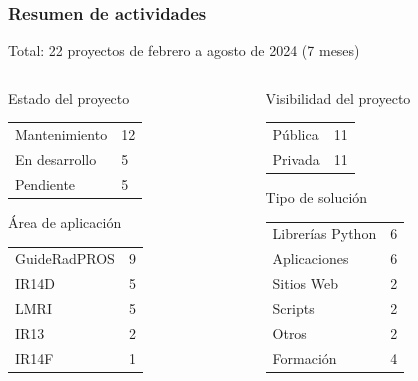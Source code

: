 \documentclass{beamer}
\newcommand{\highlight}[1]{{\color{blue} #1}}
\begin{document}
	\begin{frame}
		\frametitle{Resumen de actividades}
		\centering
		\highlight{Total}: 22 proyectos de febrero a agosto de 2024 (7 meses)
		\begin{columns}
			\begin{column}{0.35\textwidth}
				\begin{block}{Estado del proyecto}
					\begin{tabular}{ll}
						Mantenimiento&12\\
						En desarrollo&5\\
						Pendiente&5\\
					\end{tabular}
				\end{block}
				\begin{block}{Área de aplicación}
					\begin{tabular}{ll}
						GuideRadPROS&9\\
						IR14D&5\\
						LMRI&5\\
						IR13&2\\
						IR14F&1\\
					\end{tabular}
				\end{block}
			\end{column}
			\begin{column}{0.35\textwidth}
				\begin{block}{Visibilidad del proyecto}
					\begin{tabular}{ll}
						Pública&11\\
						Privada&11\\
					\end{tabular}
				\end{block}
				\begin{block}{Tipo de solución}
					\begin{tabular}{ll}
						Librerías Python&6\\
						Aplicaciones&6\\
						Sitios Web&2\\
						Scripts&2\\
						Otros&2\\
						Formación&4\\
					\end{tabular}
				\end{block}
			\end{column}
		\end{columns}
	\end{frame}
	
\end{document}
